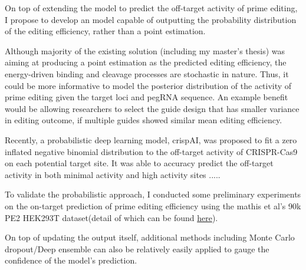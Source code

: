 \documentclass[a4,12pt]{article}
\begin{document}
On top of extending the model to predict the off-target activity of prime editing, I propose to develop an model capable of outputting the probability distribution of the editing efficiency, rather than a point estimation.

Although majority of the existing solution (including my master's thesis) was aiming at producing a point estimation as the predicted editing efficiency\parencite{mathisMachineLearningPrediction2024,yuPredictionEfficienciesDiverse2023,koeppelPredictionPrimeEditing2023}, the energy-driven binding and cleavage processes are stochastic in nature\cite{stortzPiCRISPRPhysicallyInformed2023}. Thus, it could be more informative to model the posterior distribution of the activity of prime editing given the target loci and pegRNA sequence. An example benefit would be allowing researchers to select the guide design that has smaller variance in editing outcome, if multiple guides showed similar mean editing efficiency.

Recently, a probabilistic deep learning model, crispAI, was proposed to fit a zero inflated negative binomial distribution to the off-target activity of CRISPR-Cas9 on each potential target site\parencite{ozdenLearningQuantifyUncertainty2024}. It was able to accuracy predict the off-target activity in both minimal activity and high activity sites .....

To validate the probabilistic approach, I conducted some preliminary experiments on the on-target prediction of prime editing efficiency using the mathis et al's 90k PE2 HEK293T dataset(detail of which can be found \href{https://github.com/PeihengLu/PEOff/blob/main/txt/preliminary/preliminary.pdf}{here})\parencite{mathisPredictingPrimeEditing2023}. 


On top of updating the output itself, additional methods including Monte Carlo dropout\parencite{galDropoutBayesianApproximation2016}/Deep ensemble can also be relatively easily applied to gauge the confidence of the model's prediction.
\end{document}
